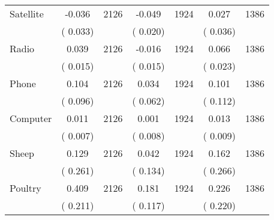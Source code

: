 \begin{tabular}{l*{6}{c}}
Satellite        &             -0.036      &       2126       &             -0.049      &       1924       &              0.027      &       1386       \\
                       &       (       0.033)            &                               &       (       0.020)            &                               &       (       0.036)            &                               \\
Radio        &              0.039      &       2126       &             -0.016      &       1924       &              0.066      &       1386       \\
                       &       (       0.015)            &                               &       (       0.015)            &                               &       (       0.023)            &                               \\
Phone        &              0.104      &       2126       &              0.034      &       1924       &              0.101      &       1386       \\
                       &       (       0.096)            &                               &       (       0.062)            &                               &       (       0.112)            &                               \\
Computer        &              0.011      &       2126       &              0.001      &       1924       &              0.013      &       1386       \\
                       &       (       0.007)            &                               &       (       0.008)            &                               &       (       0.009)            &                               \\
Sheep        &              0.129      &       2126       &              0.042      &       1924       &              0.162      &       1386       \\
                       &       (       0.261)            &                               &       (       0.134)            &                               &       (       0.266)            &                               \\
Poultry        &              0.409      &       2126       &              0.181      &       1924       &              0.226      &       1386       \\
                       &       (       0.211)            &                               &       (       0.117)            &                               &       (       0.220)            &                               \\

\end{tabular}
